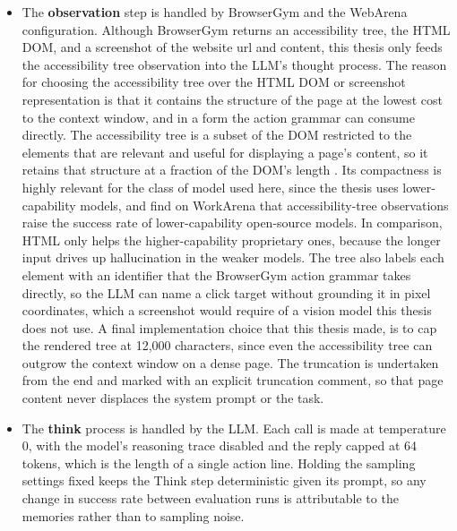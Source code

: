 \begin{itemize}
    \item The \textbf{observation} step is handled by BrowserGym and the
    WebArena configuration. Although BrowserGym returns an accessibility tree, the HTML DOM, and a screenshot of the website url and content, this thesis only feeds the accessibility tree observation into the LLM's thought process.
    The reason for choosing the accessibility tree over the HTML DOM or
    screenshot representation is that it contains the structure of the page at
    the lowest cost to the context window, and in a form the action grammar can consume directly. The accessibility tree is a subset of the DOM restricted to the elements that are relevant and useful for displaying a page's content, so it retains that structure at a fraction of the DOM's length \citep{zhou2024webarena}. Its compactness is highly relevant for the class of model used here, since the thesis uses lower-capability models, and \citet{enomoto2026observation} find on WorkArena that accessibility-tree observations raise the success rate of lower-capability
    open-source models. In comparison, HTML only helps the higher-capability proprietary ones, because the longer input drives up hallucination in the weaker models.
    The tree also labels each element with an identifier that the BrowserGym
    action grammar takes directly, so the LLM can name a click target without
    grounding it in pixel coordinates, which a screenshot would require of a
    vision model this thesis does not use.
    A final implementation choice that this thesis made, is to cap the rendered tree at 12,000 characters, since even the accessibility tree can outgrow the context window on a dense page. The truncation is undertaken from the end and marked with an explicit truncation comment, so that page content never displaces the system prompt or the task.

    \item The \textbf{think} process is handled by the LLM.
    Each call is made at temperature 0, with the model's reasoning trace
    disabled and the reply capped at 64 tokens, which is the length of a single
    action line. Holding the sampling settings
    fixed keeps the Think step deterministic given its prompt, so any change in
    success rate between evaluation runs is attributable to the memories rather
    than to sampling noise.


\end{itemize}
